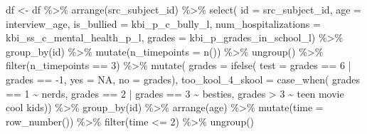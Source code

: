\documentclass[
]{book}
\newenvironment{Shaded}{\begin{snugshade}}{\end{snugshade}}
\newcommand{\AttributeTok}[1]{\textcolor[rgb]{0.77,0.63,0.00}{#1}}
\newcommand{\ConstantTok}[1]{\textcolor[rgb]{0.00,0.00,0.00}{#1}}
\newcommand{\DecValTok}[1]{\textcolor[rgb]{0.00,0.00,0.81}{#1}}
\newcommand{\FunctionTok}[1]{\textcolor[rgb]{0.00,0.00,0.00}{#1}}
\newcommand{\NormalTok}[1]{#1}
\newcommand{\OtherTok}[1]{\textcolor[rgb]{0.56,0.35,0.01}{#1}}
\newcommand{\SpecialCharTok}[1]{\textcolor[rgb]{0.00,0.00,0.00}{#1}}
\newcommand{\StringTok}[1]{\textcolor[rgb]{0.31,0.60,0.02}{#1}}
\begin{document}
\begin{Shaded}
\begin{Highlighting}[]
\NormalTok{df }\OtherTok{\textless{}{-}}\NormalTok{ df }\SpecialCharTok{\%\textgreater{}\%} 
  \FunctionTok{arrange}\NormalTok{(src\_subject\_id) }\SpecialCharTok{\%\textgreater{}\%} 
  \FunctionTok{select}\NormalTok{(}
    \AttributeTok{id =}\NormalTok{ src\_subject\_id, }
    \AttributeTok{age =}\NormalTok{ interview\_age, }
    \AttributeTok{is\_bullied =}\NormalTok{ kbi\_p\_c\_bully\_l,}
    \AttributeTok{num\_hospitalizations =}\NormalTok{ kbi\_ss\_c\_mental\_health\_p\_l,}
    \AttributeTok{grades =}\NormalTok{ kbi\_p\_grades\_in\_school\_l) }\SpecialCharTok{\%\textgreater{}\%} 
  \FunctionTok{group\_by}\NormalTok{(id) }\SpecialCharTok{\%\textgreater{}\%} 
  \FunctionTok{mutate}\NormalTok{(}\AttributeTok{n\_timepoints =} \FunctionTok{n}\NormalTok{()) }\SpecialCharTok{\%\textgreater{}\%} 
  \FunctionTok{ungroup}\NormalTok{() }\SpecialCharTok{\%\textgreater{}\%} 
  \FunctionTok{filter}\NormalTok{(n\_timepoints }\SpecialCharTok{==} \DecValTok{3}\NormalTok{) }\SpecialCharTok{\%\textgreater{}\%} 
  \FunctionTok{mutate}\NormalTok{(}
    \AttributeTok{grades =} \FunctionTok{ifelse}\NormalTok{(}
      \AttributeTok{test =}\NormalTok{ grades }\SpecialCharTok{==} \DecValTok{6} \SpecialCharTok{|}\NormalTok{ grades }\SpecialCharTok{==} \SpecialCharTok{{-}}\DecValTok{1}\NormalTok{,}
      \AttributeTok{yes =} \ConstantTok{NA}\NormalTok{,}
      \AttributeTok{no =}\NormalTok{ grades),}
    \AttributeTok{too\_kool\_4\_skool =} \FunctionTok{case\_when}\NormalTok{(}
\NormalTok{      grades }\SpecialCharTok{==} \DecValTok{1} \SpecialCharTok{\textasciitilde{}} \StringTok{\textquotesingle{}nerds\textquotesingle{}}\NormalTok{,}
\NormalTok{      grades }\SpecialCharTok{==} \DecValTok{2} \SpecialCharTok{|}\NormalTok{ grades }\SpecialCharTok{==} \DecValTok{3} \SpecialCharTok{\textasciitilde{}} \StringTok{\textquotesingle{}besties\textquotesingle{}}\NormalTok{,}
\NormalTok{      grades }\SpecialCharTok{\textgreater{}} \DecValTok{3} \SpecialCharTok{\textasciitilde{}} \StringTok{\textquotesingle{}teen movie cool kids\textquotesingle{}}\NormalTok{)) }\SpecialCharTok{\%\textgreater{}\%} 
  \FunctionTok{group\_by}\NormalTok{(id) }\SpecialCharTok{\%\textgreater{}\%} 
  \FunctionTok{arrange}\NormalTok{(age) }\SpecialCharTok{\%\textgreater{}\%} 
  \FunctionTok{mutate}\NormalTok{(}\AttributeTok{time =} \FunctionTok{row\_number}\NormalTok{()) }\SpecialCharTok{\%\textgreater{}\%} 
  \FunctionTok{filter}\NormalTok{(time }\SpecialCharTok{\textless{}=} \DecValTok{2}\NormalTok{) }\SpecialCharTok{\%\textgreater{}\%} 
  \FunctionTok{ungroup}\NormalTok{()}
\end{Highlighting}
\end{Shaded}
\end{document}
